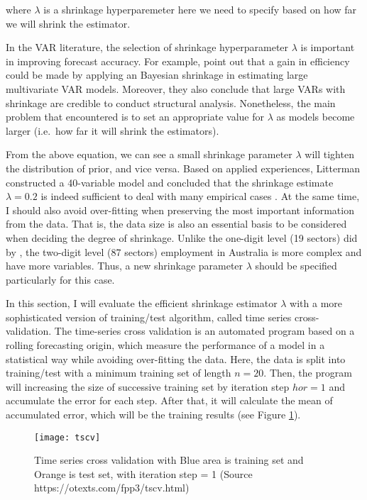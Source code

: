 \documentclass{monashthesis}
\begin{document}
where \(\lambda\) is a shrinkage hyperparemeter here we need to specify based on how far we will shrink the estimator.

In the VAR literature, the selection of shrinkage hyperparameter \(\lambda\) is important in improving forecast accuracy. For example, \textcite{banbura2010large} point out that a gain in efficiency could be made by applying an Bayesian shrinkage in estimating large multivariate VAR models. Moreover, they also conclude that large VARs with shrinkage are credible to conduct structural analysis. Nonetheless, the main problem that encountered is to set an appropriate value for \(\lambda\) as models become larger (i.e.~how far it will shrink the estimators).

From the above equation, we can see a small shrinkage parameter \(\lambda\) will tighten the distribution of prior, and vice versa. Based on applied experiences, Litterman constructed a 40-variable model and concluded that the shrinkage estimate \(\lambda=0.2\) is indeed sufficient to deal with many empirical cases \autocite{litterman1986}. At the same time, I should also avoid over-fitting when preserving the most important information from the data. That is, the data size is also an essential basis to be considered when deciding the degree of shrinkage\autocite{banbura2010large}. Unlike the one-digit level (19 sectors) did by \textcite{anderson2020}, the two-digit level (87 sectors) employment in Australia is more complex and have more variables. Thus, a new shrinkage parameter \(\lambda\) should be specified particularly for this case.

In this section, I will evaluate the efficient shrinkage estimator \(\lambda\) with a more sophisticated version of training/test algorithm, called time series cross-validation. The time-series cross validation is an automated program based on a rolling forecasting origin, which measure the performance of a model in a statistical way while avoiding over-fitting the data. Here, the data is split into training/test with a minimum training set of length \(n=20\). Then, the program will increasing the size of successive training set by iteration step \(hor=1\) and accumulate the error for each step. After that, it will calculate the mean of accumulated error, which will be the training results (see Figure \ref{fig:tscv}).

\graphicspath{ {/Users/elvisyang/Desktop/hon_proj/Disaggregated_Employment/Honours_thesis/figures} }

\begin{figure}[t]
\texttt{[image: tscv]}
\centering
\caption{Time series cross validation with Blue area is training set and Orange is test set, with iteration step = 1 (Source https://otexts.com/fpp3/tscv.html)}
\label{fig:tscv}
\end{figure}
\end{document}
